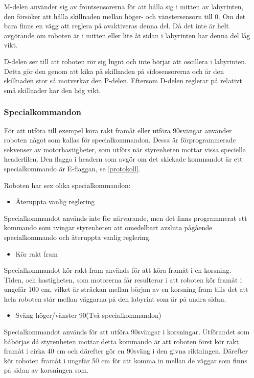 M-delen använder sig av frontsensorerna för att hålla sig i mitten av
labyrinten, den försöker att hålla skillnaden mellan höger- och vänstersensorn
till 0. Om det bara finns en vägg att reglera på avaktiveras denna del. Då det
inte är helt avgörande om roboten är i mitten eller lite åt sidan i labyrinten
har denna del låg vikt.


D-delen ser till att roboten rör sig lugnt och inte börjar att oscillera i
labyrinten. Detta gör den genom att kika på skillnaden på sidosensorerna och är
den skillnaden stor så motverkar den P-delen. Eftersom D-delen reglerar på
relativt små skillnader har den hög vikt.
\label{reglering}

\subsubsection{Specialkommandon}
För att utföra till exempel köra rakt framåt eller utföra 90\degree svängar använder
roboten något som kallas för specialkommandon. Dessa är förprogrammerade 
sekvenser av motorhastigheter, som utförs när styrenheten mottar vissa speciella
headerfilen. Den flagga i headern som avgör om det skickade kommandot är ett
specialkommando är E-flaggan, se \ref{protokoll}.

Roboten har sex olika specialkommandon:

 \begin{itemize}
\item Återuppta vanlig reglering
\end{itemize}
Specialkommandot används inte för närvarande, men det finns programmerat ett
kommando som tvingar styrenheten att omedelbart avsluta pågående specialkommando
och återuppta vanlig reglering.

\begin{itemize}
\item Kör rakt fram
\end{itemize}
Specialkommandot kör rakt fram används för att köra framåt i en korsning. Tiden, och hastigheten,
 som motorerna får resulterar i att roboten kör framåt  i ungefär 100 cm, vilket är sträckan mellan 
 början av en korsning fram tills det att hela roboten står mellan väggarna på den labyrint som är 
 på andra sidan.
 
 \begin{itemize}
\item Sväng höger/vänster 90\degree (Två specialkommandon) 
\end{itemize}
Specialkommandot används för att utföra 90\degree  svängar i korsningar. Utförandet som båbörjas
då styrenheten mottar detta kommando är att roboten först kör rakt framåt i cirka 40 cm och därefter
gör en 90\degree sväng i den givna riktningen. Därefter kör roboten framåt i ungefär 50 cm för 
att komma in mellan de väggar som finns på sidan av korsningen som.

